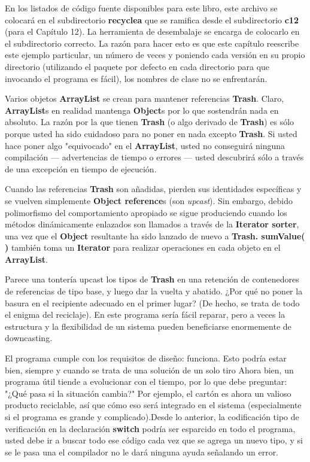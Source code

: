 \documentclass{article}
\begin{document}
En los listados de código fuente disponibles para este libro, este archivo se colocará en el subdirectorio \textbf{recyclea} que se ramifica desde el subdirectorio \textbf{c12} (para el Capítulo 12). La herramienta de desembalaje se encarga de colocarlo en el subdirectorio correcto. La razón para hacer esto es que este capítulo reescribe este ejemplo particular, un número de veces y poniendo cada versión en su propio directorio (utilizando el paquete por defecto en cada directorio para que invocando el programa es fácil), los nombres de clase no se enfrentarán.     \newline

Varios objetos \textbf{ArrayList} se crean para mantener referencias \textbf{Trash}. Claro, \textbf{ArrayList}s en realidad mantenga \textbf{Object}s por lo que sostendrán nada en absoluto. La razón por la que tienen \textbf{Trash} (o algo derivado de \textbf{Trash}) es sólo porque usted ha sido cuidadoso para no poner en nada excepto \textbf{Trash}. Si usted hace poner algo "equivocado" en el \textbf{ArrayList}, usted no conseguirá ninguna compilación — advertencias de tiempo o errores — usted descubrirá sólo a través de una excepción en tiempo de ejecución.   \newline

Cuando las referencias \textbf{Trash} son añadidas, pierden sus identidades específicas y se vuelven simplemente \textbf{Object reference}s (son \textit{upcast}). Sin embargo, debido polimorfismo del comportamiento apropiado se sigue produciendo cuando los métodos dinámicamente enlazados son llamados a través de la \textbf{Iterator sorter}, una vez que el \textbf{Object} resultante ha sido lanzado de nuevo a \textbf{Trash. sumValue( )} también toma un \textbf{Iterator} para realizar operaciones en cada objeto en el \textbf{ArrayList}.   \newline

Parece una tontería upcast los tipos de \textbf{Trash} en una retención de contenedores de referencias de tipo base, y luego dar la vuelta y abatido. ¿Por qué no poner la basura en el recipiente adecuado en el primer lugar? (De hecho, se trata de todo el enigma del reciclaje). En este programa sería fácil reparar, pero a veces la estructura y la flexibilidad de un sistema pueden beneficiarse enormemente de downcasting.     \newline

El programa cumple con los requisitos de diseño: funciona. Esto podría estar bien, siempre y cuando se trata de una solución de un solo tiro Ahora bien, un programa útil tiende a evolucionar con el tiempo, por lo que debe preguntar: "¿Qué pasa si la situación cambia?" Por ejemplo, el cartón es ahora un valioso producto reciclable, así que cómo eso será integrado en el sistema (especialmente si el programa es grande y complicado).Desde lo anterior, la codificación tipo de verificación en la declaración \textbf{switch} podría ser esparcido en todo el programa, usted debe ir a buscar todo ese código cada vez que se agrega un nuevo tipo, y si se le pasa una el compilador no le dará ninguna ayuda señalando un error.  \newline
\end{document}
